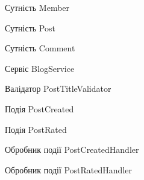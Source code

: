 \vspace{\baselineskip}

Сутність Member


Сутність Post


Сутність Comment


Сервіс BlogService


Валідатор PostTitleValidator


Подія PostCreated


Подія PostRated


Обробник події PostCreatedHandler


Обробник події PostRatedHandler


\clearpage
